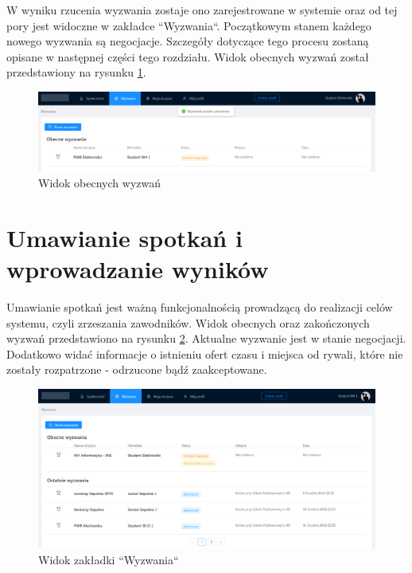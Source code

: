 W wyniku rzucenia wyzwania zostaje ono zarejestrowane w systemie oraz od tej pory jest widoczne w zakładce ``Wyzwania``. Początkowym stanem każdego nowego wyzwania są negocjacje. Szczegóły dotyczące tego procesu zostaną opisane w następnej części tego rozdziału. Widok obecnych wyzwań został przedstawiony na rysunku \ref{fig:ss-search-8}.

\begin{figure}[H]
\centering
\includegraphics[width=\linewidth]{065-dzialanie/rys/ss-search-8.PNG}
\caption{Widok obecnych wyzwań}
\label{fig:ss-search-8}
\end{figure}


\section{Umawianie spotkań i wprowadzanie wyników}

Umawianie spotkań jest ważną funkcjonalnością prowadzącą do realizacji celów systemu, czyli zrzeszania zawodników. Widok obecnych oraz zakończonych wyzwań przedstawiono na rysunku \ref{fig:ss--match-0}. Aktualne wyzwanie jest w stanie negocjacji. Dodatkowo widać informacje o istnieniu ofert czasu i miejsca od rywali, które nie zostały rozpatrzone - odrzucone bądź zaakceptowane.

\begin{figure}[H]
\centering
\includegraphics[width=\linewidth]{065-dzialanie/rys/ss-match-0.PNG}
\caption{Widok zakładki ``Wyzwania``}
\label{fig:ss--match-0}
\end{figure}

